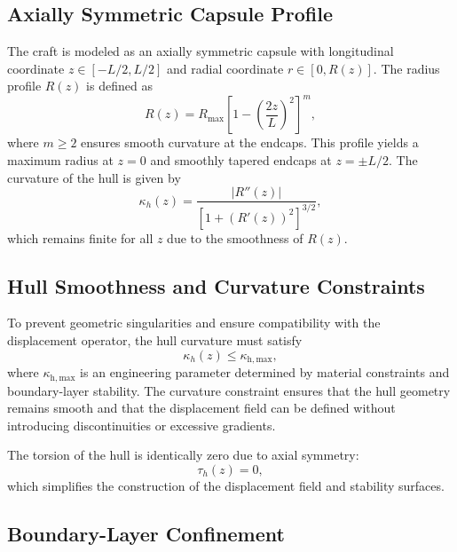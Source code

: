 \documentclass[aip,adv,reprint,floatfix]{revtex4-2}
\begin{document}
\subsection{Axially Symmetric Capsule Profile}

The craft is modeled as an axially symmetric capsule with longitudinal coordinate $z \in [-L/2, L/2]$ and radial coordinate $r \in [0, R(z)]$. The radius profile $R(z)$ is defined as
\begin{equation}
R(z) = R_{\max} \left[ 1 - \left( \frac{2z}{L} \right)^2 \right]^m,
\end{equation}
where $m \geq 2$ ensures smooth curvature at the endcaps. This profile yields a maximum radius at $z = 0$ and smoothly tapered endcaps at $z = \pm L/2$. The curvature of the hull is given by
\begin{equation}
\kappa_h(z) = \frac{\left| R''(z) \right|}{\left[ 1 + \left( R'(z) \right)^2 \right]^{3/2}},
\end{equation}
which remains finite for all $z$ due to the smoothness of $R(z)$.

\subsection{Hull Smoothness and Curvature Constraints}

To prevent geometric singularities and ensure compatibility with the displacement operator, the hull curvature must satisfy
\begin{equation}
\kappa_h(z) \leq \kappa_{\mathrm{h,max}},
\end{equation}
where $\kappa_{\mathrm{h,max}}$ is an engineering parameter determined by material constraints and boundary-layer stability. The curvature constraint ensures that the hull geometry remains smooth and that the displacement field can be defined without introducing discontinuities or excessive gradients.

The torsion of the hull is identically zero due to axial symmetry:
\begin{equation}
\tau_h(z) = 0,
\end{equation}
which simplifies the construction of the displacement field and stability surfaces.

\subsection{Boundary-Layer Confinement}
\end{document}
